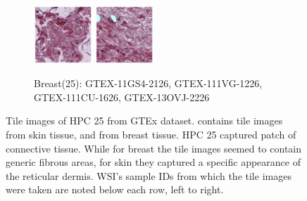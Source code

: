\documentclass{l4proj}
\begin{document}
\begin{figure}[h]
\begin{subfigure}[b]{\textwidth}
        \includegraphics[width=0.24\textwidth]{images/breast25_3.png}
        \includegraphics[width=0.24\textwidth]{images/breast25_4.png}
        \caption{Breast(25): GTEX-11GS4-2126, GTEX-111VG-1226, GTEX-111CU-1626, GTEX-13OVJ-2226}
        \label{fig:breast25}
    \end{subfigure}
    \caption{Tile images of HPC 25 from GTEx dataset.  contains tile images from skin tissue, and  from breast tissue. HPC 25 captured patch of connective tissue. While for breast the tile images seemed to contain generic fibrous areas, for skin they captured a specific appearance of the reticular dermis. WSI's sample IDs from which the tile images were taken are noted below each row, left to right.
    }\label{fig:hpc25}
\end{figure}
\end{document}
